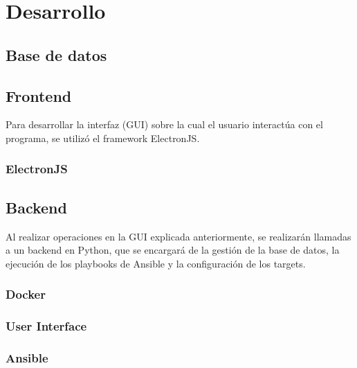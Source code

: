 \chapter{Desarrollo}
\label{ch:desarrollo}

\section{Base de datos}


\section{Frontend}
Para desarrollar la interfaz (GUI) sobre la cual el usuario interactúa con el programa, se utilizó el framework ElectronJS\cite{ElectronJS}. 

\subsection{ElectronJS}


% 

\section{Backend}
Al realizar operaciones en la GUI explicada anteriormente, se realizarán llamadas a un backend en Python, que se encargará de la gestión de la base de datos, la ejecución de los playbooks de Ansible y la configuración de los targets.
\subsection{Docker}


\subsection{User Interface}
% 

\subsection{Ansible}


